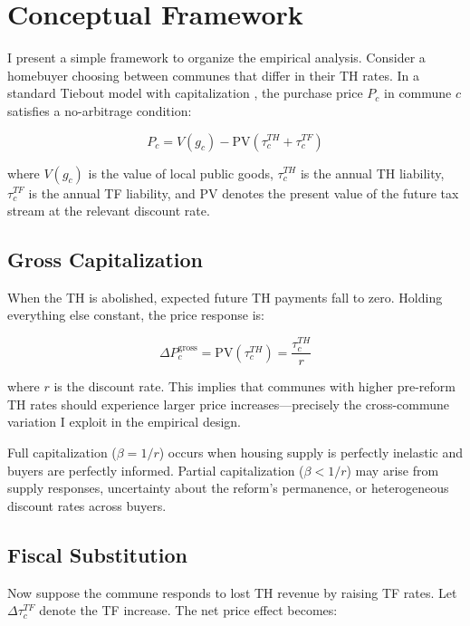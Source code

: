 \documentclass[12pt]{article}
\begin{document}
\section{Conceptual Framework}

I present a simple framework to organize the empirical analysis. Consider a homebuyer choosing between communes that differ in their TH rates. In a standard Tiebout model with capitalization \citep{tiebout1956, oates1969}, the purchase price $P_c$ in commune $c$ satisfies a no-arbitrage condition:

\begin{equation}
    P_c = V(g_c) - \text{PV}(\tau^{TH}_c + \tau^{TF}_c)
    \label{eq:price}
\end{equation}

where $V(g_c)$ is the value of local public goods, $\tau^{TH}_c$ is the annual TH liability, $\tau^{TF}_c$ is the annual TF liability, and PV denotes the present value of the future tax stream at the relevant discount rate.

\subsection{Gross Capitalization}

When the TH is abolished, expected future TH payments fall to zero. Holding everything else constant, the price response is:

\begin{equation}
    \Delta P_c^{\text{gross}} = \text{PV}(\tau^{TH}_c) = \frac{\tau^{TH}_c}{r}
    \label{eq:gross}
\end{equation}

where $r$ is the discount rate. This implies that communes with higher pre-reform TH rates should experience larger price increases---precisely the cross-commune variation I exploit in the empirical design.

Full capitalization ($\beta = 1/r$) occurs when housing supply is perfectly inelastic and buyers are perfectly informed. Partial capitalization ($\beta < 1/r$) may arise from supply responses, uncertainty about the reform's permanence, or heterogeneous discount rates across buyers.

\subsection{Fiscal Substitution}

Now suppose the commune responds to lost TH revenue by raising TF rates. Let $\Delta \tau^{TF}_c$ denote the TF increase. The net price effect becomes:
\end{document}
